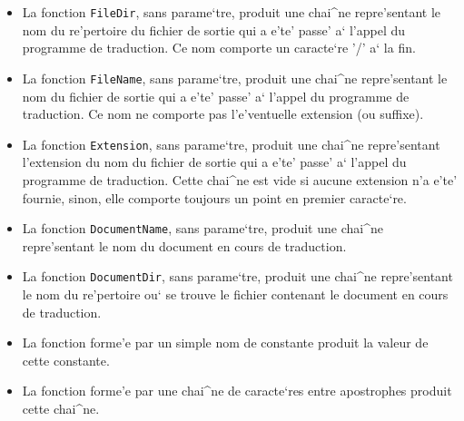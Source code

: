{\begin{itemize}
Par de'faut, la valeur d'un compteur est produite sous la forme d'un nombre
en chiffres arabes. Si une autre forme est souhaite'e, il faut faire
suivre le nom du compteur d'une virgule et d'un des mots cle's suivants~:
  \begin{itemize}
  \item
  {\tt Arabic} : chiffres arabes (par de'faut),
  \item
  {\tt LRoman} : chiffres romains minuscules,
  \item
  {\tt URoman} : chiffres romains majuscules,
  \item
  {\tt Uppercase} : lettre majuscule, selon l'ordre alphabe'tique,
  \item
  {\tt Lowercase} : lettre minuscule, selon l'ordre alphabe'tique.
  \end{itemize}

\item
La fonction {\tt FileDir}, sans parame`tre, produit une chai^ne
repre'sentant le nom du re'pertoire du fichier de sortie qui a e'te'
passe' a` l'appel du programme de traduction. Ce nom comporte un
caracte`re '/' a` la fin.

\item
La fonction {\tt FileName}, sans parame`tre, produit une chai^ne
repre'sentant le nom du fichier de sortie qui a e'te' passe' a` l'appel
du programme de traduction. Ce nom ne comporte pas l'e'ventuelle
extension (ou suffixe).

\item
La fonction {\tt Extension}, sans parame`tre, produit une chai^ne
repre'sentant l'extension du nom du fichier de sortie qui a e'te' passe'
a` l'appel du programme de traduction. Cette chai^ne est vide si
aucune extension n'a e'te' fournie, sinon, elle comporte toujours un
point en premier caracte`re.

\item
La fonction {\tt DocumentName}, sans parame`tre, produit une chai^ne
repre'sentant le nom du document en cours de traduction.

\item
La fonction {\tt DocumentDir}, sans parame`tre, produit une chai^ne
repre'sentant le nom du re'pertoire ou` se trouve le fichier contenant
le document en cours de traduction.

\item
La fonction forme'e par un simple nom de constante produit la valeur de cette
constante.

\item
La fonction forme'e par une chai^ne de caracte`res entre apostrophes produit
cette chai^ne.


\end{itemize}}
